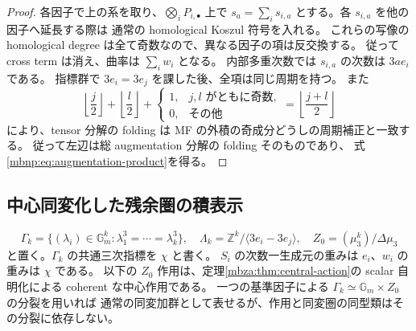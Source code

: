 \begin{proof}
各因子で上の系を取り、$\bigotimes_iP_{i,\bullet}$ 上で
$s_a=\sum_i s_{i,a}$ とする。各 $s_{i,a}$ を他の因子へ延長する際は
通常の homological Koszul 符号を入れる。
これらの写像の homological degree は全て奇数なので、異なる因子の項は反交換する。
従って cross term は消え、曲率は $\sum_iw_i$ となる。
内部多重次数では $s_{i,a}$ の次数は $3ae_i$ である。
指標群で $3e_i=3e_j$ を課した後、全項は同じ周期を持つ。
また
\[
 \left\lfloor\frac j2\right\rfloor+
 \left\lfloor\frac l2\right\rfloor+
 \begin{cases}1,&j,l\text{ がともに奇数},\\0,&\text{その他}\end{cases}
 =\left\lfloor\frac{j+l}{2}\right\rfloor
\]
により、tensor 分解の folding は MF の外積の奇成分どうしの周期補正と一致する。
従って左辺は総 augmentation 分解の folding そのものであり、
式\eqref{mbnp:eq:augmentation-product}を得る。
\end{proof}

\subsection{中心同変化した残余圏の積表示}

\[
 \Gamma_k=\{(\lambda_i)\in\mathbb G_m^k:
                 \lambda_1^3=\cdots=\lambda_k^3\},\quad
 \Lambda_k=\mathbb Z^k/\langle3e_i-3e_j\rangle,
 \quad Z_0=(\mu_3^k)/\Delta\mu_3
\]
と置く。$\Gamma_k$ の共通三次指標を $\chi$ と書く。
$S_i$ の次数一生成元の重みは $e_i$、$w_i$ の重みは $\chi$ である。
以下の $Z_0$ 作用は、定理\ref{mbza:thm:central-action}の
scalar 自明化による coherent な中心作用である。
一つの基準因子による $\Gamma_k\simeq\mathbb G_m\times Z_0$ の分裂を用いれば
通常の同変加群として表せるが、作用と同変圏の同型類はその分裂に依存しない。


